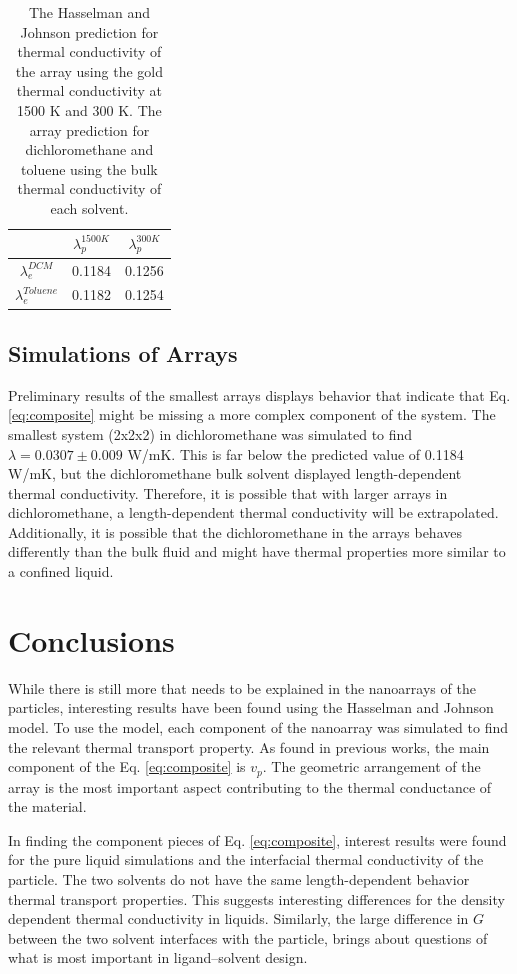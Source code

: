 \begin{table}[]
    \centering
    \begin{tabular}{c|c|c}
    \toprule
         &$\lambda_p^{1500 K}$ & $\lambda_p^{300 K}$  \\
         \hline
         $\lambda_e^{DCM}$& 0.1184& 0.1256\\
         $\lambda_e^{Toluene}$ & 0.1182 & 0.1254 \\
         \bottomrule
    \end{tabular}
    \caption{The Hasselman and Johnson prediction for thermal conductivity of the  array using the gold thermal conductivity at 1500 K and 300 K. The array prediction for dichloromethane and toluene using the bulk thermal conductivity of each solvent.}
    \label{tab:predition}
\end{table}

\subsection{Simulations of Arrays}
Preliminary results of the smallest arrays displays behavior that indicate that Eq. \ref{eq:composite} might be missing a more complex component of the system.
The smallest system (2x2x2) in dichloromethane was simulated to find $\lambda = 0.0307 \pm 0.009$ W/mK. 
This is far below the predicted value of 0.1184 W/mK, but the dichloromethane bulk solvent displayed length-dependent thermal conductivity.
Therefore, it is possible that with larger arrays in dichloromethane, a length-dependent thermal conductivity will be extrapolated. 
Additionally, it is possible that the dichloromethane in the arrays behaves differently than the bulk fluid and might have thermal properties more similar to a confined liquid.

\section{Conclusions}
While there is still more that needs to be explained in the nanoarrays of the  particles, interesting results have been found using the Hasselman and Johnson model. 
To use the model, each component of the nanoarray was simulated to find the relevant thermal transport property. 
As found in previous works, the main component of the Eq. \ref{eq:composite} is $v_p$. 
The geometric arrangement of the array is the most important aspect contributing to the thermal conductance of the material.

In finding the component pieces of Eq. \ref{eq:composite}, interest results were found for the pure liquid simulations and the interfacial thermal conductivity of the particle.
The two solvents do not have the same length-dependent behavior thermal transport properties. This suggests interesting differences for the density dependent thermal conductivity in liquids.
Similarly, the large difference in $G$ between the two solvent interfaces with the particle, brings about questions of what is most important in ligand--solvent design.

